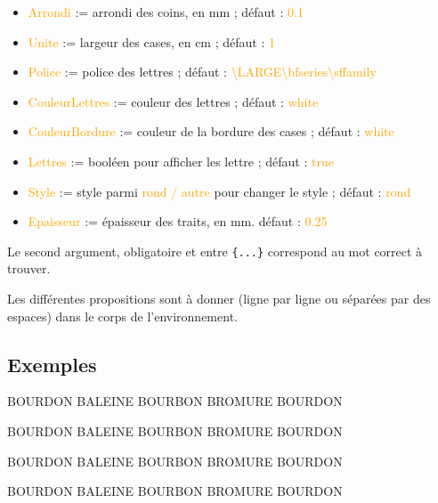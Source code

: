 \documentclass[french,a4paper,11pt]{article}
\newcommand\Cle[1]{{\small\sffamily\textlangle \textcolor{orange}{#1}\textrangle}}
\begin{document}
{\begin{tipblock}
\begin{itemize}
	\hfill{}défaut : \Cle{cyan!75!black,yellow,red},%
	\item \Cle{Arrondi} := arrondi des coins, en mm ; \hfill{}défaut : \Cle{0.1}
	\item \Cle{Unite} := largeur des cases, en cm ; \hfill{}défaut : \Cle{1}
	\item \Cle{Police} := police des lettres ; \hfill{}défaut : \Cle{\textbackslash LARGE\textbackslash bfseries\textbackslash sffamily}
	\item \Cle{CouleurLettres} := couleur des lettres ; \hfill{}défaut : \Cle{white}
	\item \Cle{CouleurBordure} := couleur de la bordure des cases ; \hfill{}défaut : \Cle{white}
	\item \Cle{Lettres} := booléen pour afficher les lettre ; \hfill{}défaut : \Cle{true}
	\item \Cle{Style} := style parmi \Cle{rond / autre} pour changer le style ; \hfill{}défaut : \Cle{rond}
	\item \Cle{Epaisseur} := épaisseur des traits, en mm. \hfill{}défaut : \Cle{0.25}
\end{itemize}
\vspace*{-\baselineskip}\leavevmode
\end{tipblock}

\begin{tipblock}
Le second argument, obligatoire et entre \texttt{\{...\}} correspond au mot correct à trouver.

\smallskip

Les différentes propositions sont à donner (ligne par ligne ou séparées par des espaces) dans le corps de l'environnement.
\end{tipblock}

\subsection{Exemples}

\begin{DemoCode}[]
\begin{GrilleSutom}{BOURDON}
	BALEINE
	BOURBON
	BROMURE
	BOURDON
\end{GrilleSutom}
%
\hspace{5mm}
%
\begin{GrilleSutom}[Style=alt]{BOURDON}
	BALEINE BOURBON BROMURE BOURDON
\end{GrilleSutom}
\end{DemoCode}

\begin{DemoCode}[]
\begin{GrilleSutom}
		[Style=alt,Epaisseur=0.3,CouleurBordure=black,%
		Couleurs={lightgray,orange,teal}]%
		{BOURDON}
	BALEINE BOURBON BROMURE BOURDON
\end{GrilleSutom}
%
\hspace{5mm}
%
\begin{GrilleSutom}
	[Arrondi=0,Epaisseur=0.3,CouleurBordure=black,%
	Couleurs={lightgray,orange,teal}]%
	{BOURDON}
	BALEINE BOURBON BROMURE BOURDON
\end{GrilleSutom}
\end{DemoCode}

}
\end{document}
